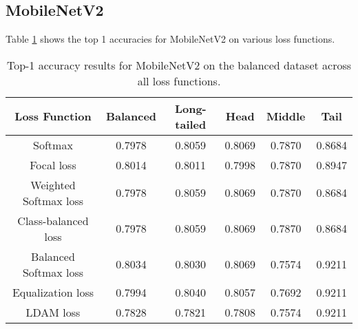 \subsection{MobileNetV2}
Table \ref{tab:mobilenet_bal_acc1_1} shows the top 1 accuracies for MobileNetV2 on various loss functions.


\begin{table}[H]
    \centering
    \begin{tabular}{cccccc}
        \toprule
        Loss Function & Balanced & Long-tailed & Head & Middle & Tail \\ 
        \midrule
        Softmax   & 0.7978   & 0.8059 & 0.8069 & 0.7870 & 0.8684 \\
        Focal loss   & 0.8014   & 0.8011 & 0.7998 & 0.7870 & 0.8947 \\
        Weighted Softmax loss   & 0.7978   & 0.8059 & 0.8069 & 0.7870 & 0.8684 \\
        Class-balanced loss   & 0.7978   & 0.8059 & 0.8069 & 0.7870 & 0.8684 \\
        Balanced Softmax loss   & 0.8034  & 0.8030 & 0.8069 & 0.7574 & 0.9211 \\
        Equalization loss   & 0.7994   & 0.8040 & 0.8057 & 0.7692 & 0.9211 \\
        LDAM loss   &  0.7828   & 0.7821 & 0.7808 & 0.7574 & 0.9211 \\
        \bottomrule
    \end{tabular}
    \caption{Top-1 accuracy results for MobileNetV2 on the balanced dataset across all loss functions.}
    \label{tab:mobilenet_bal_acc1_1}
\end{table}

